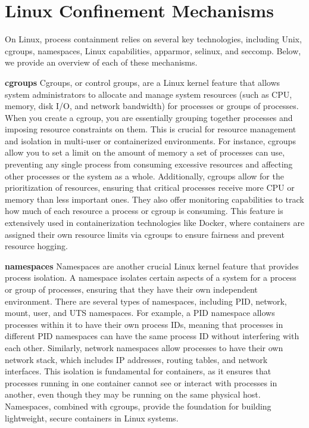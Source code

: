 \section{Linux Confinement Mechanisms}

On Linux, process containment relies on several key technologies, including Unix, cgroups, namespaces, Linux capabilities, apparmor, selinux, and seccomp. Below, we provide an overview of each of these mechanisms.

\textbf{cgroups}
Cgroups, or control groups, are a Linux kernel feature that allows system administrators to allocate and manage system resources (such as CPU, memory, disk I/O, and network bandwidth) for processes or groups of processes. When you create a cgroup, you are essentially grouping together processes and imposing resource constraints on them. This is crucial for resource management and isolation in multi-user or containerized environments. For instance, cgroups allow you to set a limit on the amount of memory a set of processes can use, preventing any single process from consuming excessive resources and affecting other processes or the system as a whole. Additionally, cgroups allow for the prioritization of resources, ensuring that critical processes receive more CPU or memory than less important ones. They also offer monitoring capabilities to track how much of each resource a process or cgroup is consuming. This feature is extensively used in containerization technologies like Docker, where containers are assigned their own resource limits via cgroups to ensure fairness and prevent resource hogging.

\textbf{namespaces}
Namespaces are another crucial Linux kernel feature that provides process isolation. A namespace isolates certain aspects of a system for a process or group of processes, ensuring that they have their own independent environment. There are several types of namespaces, including PID, network, mount, user, and UTS namespaces. For example, a PID namespace allows processes within it to have their own process IDs, meaning that processes in different PID namespaces can have the same process ID without interfering with each other. Similarly, network namespaces allow processes to have their own network stack, which includes IP addresses, routing tables, and network interfaces. This isolation is fundamental for containers, as it ensures that processes running in one container cannot see or interact with processes in another, even though they may be running on the same physical host. Namespaces, combined with cgroups, provide the foundation for building lightweight, secure containers in Linux systems.

